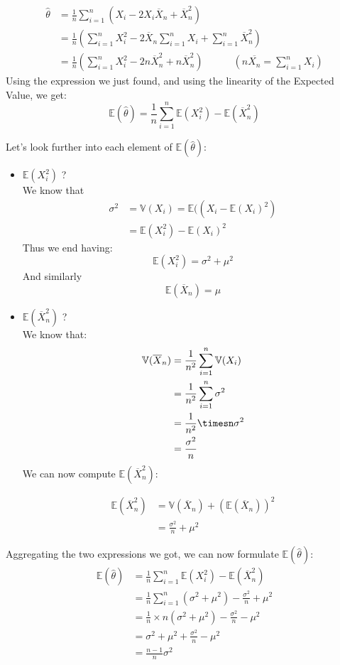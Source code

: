 \documentclass{article}
\begin{document}
\[
\begin{split}
\hat{\theta} & = \frac{1}{n}\sum\limits_{i=1}^{n}(X_i - 2X_i\overline{X}_n+\overline{X}_n^2) \\
& = \frac{1}{n}(\sum\limits_{i=1}^{n}X_i^2 - 2\overline{X}_n\sum\limits_{i=1}^{n}X_i+\sum\limits_{i=1}^{n}\overline{X}_n^2) \\
& = \frac{1}{n}(\sum\limits_{i=1}^{n}X_i^2 - 2n\overline{X}_n^2+n\overline{X}_n^2) \quad\quad\quad (n\overline{X_n} = \sum\limits_{i=1}^{n}X_i)
\end{split}
\]
Using the expression we just found, and using the linearity of the Expected Value, we get:
\[
\mathbb{E}(\hat{\theta})=\frac{1}{n}\sum\limits_{i=1}^{n}\mathbb{E}(X_i^2)-\mathbb{E}(\overline{X}_n^2)
\]

Let's look further into each element of $\mathbb{E}(\hat{\theta})$:
\begin{itemize}
\item \textbf{$\mathbb{E}(X_i^2)$} ? \\
\newline We know that 
\[
\begin{split}
\sigma^2 & = \mathbb{V}(X_i) = \mathbb{E}((X_i - \mathbb{E}(X_i)^2) \\
& = \mathbb{E}(X_i^2)- \mathbb{E}(X_i)^2
\end{split}
\]
Thus we end having:
\[
\mathbb{E}(X_i^2) = \sigma^2 + \mu^2
\]
And similarly
\[
\mathbb{E}(\overline{X}_n) = \mu
\]
\item \textbf{$\mathbb{E}(\overline{X}_n^2)$} ? \\
\newline We know that:
\[
\begin{split}
\mathbb{V}(\overline{X}_n) & = \frac{1}{n^2}\sum\limits_{i=1}^{n}\mathbb{V}(X_i) \\
& = \frac{1}{n^2}\sum\limits_{i=1}^{n}\sigma^2 \\
& = \frac{1}{n^2}\timesn\sigma^2 \\
& = \frac{\sigma^2}{n}
\end{split}
\]
We can now compute $\mathbb{E}(\overline{X}_n^2)$:

\[
\begin{split}
\mathbb{E}(\overline{X}_n^2) & = \mathbb{V}(\overline{X}_n) + (\mathbb{E}(\overline{X}_n))^2 \\
& = \frac{\sigma^2}{n} + \mu^2
\end{split}
\]
\end{itemize}
\newline Aggregating the two expressions we got, we can now formulate $\mathbb{E}(\hat{\theta})$:
\[
\begin{split}
\mathbb{E}(\hat{\theta}) & =\frac{1}{n}\sum\limits_{i=1}^{n}\mathbb{E}(X_i^2)-\mathbb{E}(\overline{X}_n^2) \\
& = \frac{1}{n}\sum\limits_{i=1}^{n}(\sigma^2+\mu^2)-\frac{\sigma^2}{n}+\mu^2 \\
& = \frac{1}{n}\times n(\sigma^2+\mu^2) - \frac{\sigma^2}{n} - \mu^2 \\
& = \sigma^2 + \mu^2 + \frac{\sigma^2}{n} - \mu^2 \\
& = \frac{n-1}{n}\sigma^2
\end{split}
\]
\end{document}
